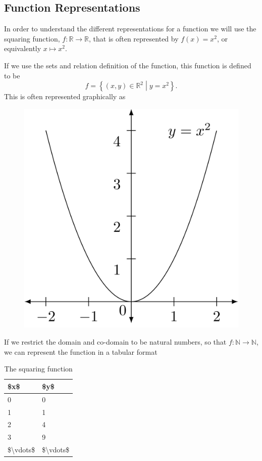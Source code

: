 \documentclass[
]{book}
\theoremstyle{definition}
\theoremstyle{definition}
\theoremstyle{definition}
\theoremstyle{definition}
\theoremstyle{remark}
\begin{document}
\hypertarget{function-representations}{%
\subsection{Function Representations}\label{function-representations}}

In order to understand the different representations for a function we will use the squaring function, \(f:\mathbb{R}\rightarrow \mathbb{R}\), that is often represented by \(f(x)=x^2\), or equivalently \(x\mapsto x^2\).

If we use the sets and relation definition of the function, this function is defined to be
\[f= \left\{ (x,y)\in \mathbb{R}^2 \middle \vert  y=x^2\right\}.\] This is often represented graphically as

\begin{figure}

{\centering \includegraphics[width=0.4\linewidth]{tikz/graph-y-equals-xsquared} 

}

\end{figure}

If we restrict the domain and co-domain to be natural numbers, so that \(f:\mathbb{N}\rightarrow \mathbb{N}\), we can represent the function in a tabular format

\begin{table}

\caption{\label{tab:squares}The squaring function}
\centering
\begin{tabular}[t]{l|l}
\hline
\$x\$ & \$y\$\\
\hline
0 & 0\\
\hline
1 & 1\\
\hline
2 & 4\\
\hline
3 & 9\\
\hline
\$\textbackslash{}vdots\$ & \$\textbackslash{}vdots\$\\
\hline
\end{tabular}
\end{table}
\end{document}
